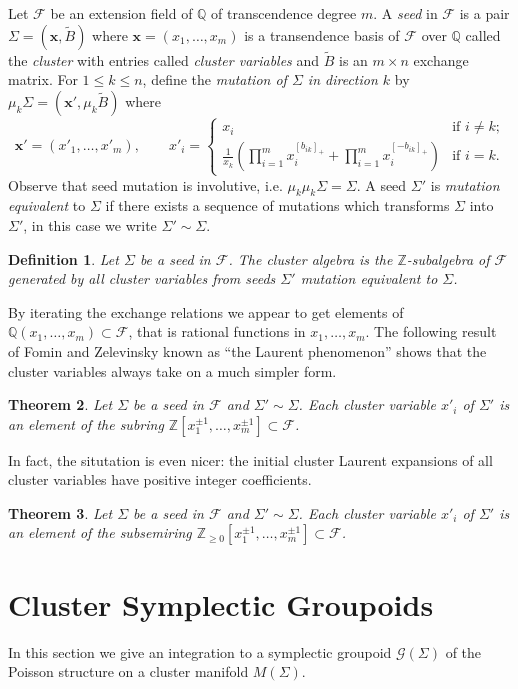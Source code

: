 \documentclass{amsart}
\newtheorem{theorem}{Theorem}[section]
\newtheorem{definition}[theorem]{Definition}
\newcommand{\bfx}{\mathbf{x}}
\newcommand{\cF}{\mathcal{F}}
\newcommand{\cG}{\mathcal{G}}
\newcommand{\QQ}{\mathbb{Q}}
\newcommand{\ZZ}{\mathbb{Z}}
\begin{document}
Let $\cF$ be an extension field of $\QQ$ of transcendence degree $m$.   
A \emph{seed} in $\cF$ is a pair $\Sigma=(\bfx,\tilde B)$ where $\bfx=(x_1,\ldots,x_m)$ is a transendence basis of $\cF$ over $\QQ$ called the \emph{cluster} with entries called \emph{cluster variables} and $\tilde B$ is an $m\times n$ exchange matrix.
For $1\le k\le n$, define the \emph{mutation of $\Sigma$ in direction $k$} by $\mu_k\Sigma=(\bfx',\mu_k\tilde B)$ where 
\[\bfx'=(x'_1,\ldots,x'_m),\qquad x'_i=\begin{cases} x_i & \text{if $i\ne k$;}\\ \frac{1}{x_k}\left(\prod\limits_{i=1}^m x_i^{[b_{ik}]_+}+\prod\limits_{i=1}^m x_i^{[-b_{ik}]_+}\right) & \text{if $i=k$.}\end{cases}\]
Observe that seed mutation is involutive, i.e. $\mu_k\mu_k\Sigma=\Sigma$.
A seed $\Sigma'$ is \emph{mutation equivalent} to $\Sigma$ if there exists a sequence of mutations which transforms $\Sigma$ into $\Sigma'$, in this case we write $\Sigma'\sim\Sigma$.
\begin{definition}
  Let $\Sigma$ be a seed in $\cF$.  The \emph{cluster algebra} is the $\ZZ$-subalgebra of $\cF$ generated by all cluster variables from seeds $\Sigma'$ mutation equivalent to $\Sigma$.
\end{definition}
By iterating the exchange relations we appear to get elements of $\QQ(x_1,\ldots,x_m)\subset\cF$, that is rational functions in $x_1,\ldots,x_m$.  
The following result of Fomin and Zelevinsky known as ``the Laurent phenomenon'' shows that the cluster variables always take on a much simpler form.
\begin{theorem}\cite{fomin-zelevinsky1}
  Let $\Sigma$ be a seed in $\cF$ and $\Sigma'\sim\Sigma$.  Each cluster variable $x'_i$ of $\Sigma'$ is an element of the subring $\ZZ[x_1^{\pm1},\ldots,x_m^{\pm1}]\subset\cF$.
\end{theorem}

In fact, the situtation is even nicer: the initial cluster Laurent expansions of all cluster variables have positive integer coefficients.
\begin{theorem}\cite{lee-schiffler, gross-hacking-keel-kontsevich}
  Let $\Sigma$ be a seed in $\cF$ and $\Sigma'\sim\Sigma$.  Each cluster variable $x'_i$ of $\Sigma'$ is an element of the subsemiring $\ZZ_{\ge0}[x_1^{\pm1},\ldots,x_m^{\pm1}]\subset\cF$. 
\end{theorem}


\section{Cluster Symplectic Groupoids}
In this section we give an integration to a symplectic groupoid $\cG(\Sigma)$ of the Poisson structure on a cluster manifold $M(\Sigma)$.  
\end{document}
